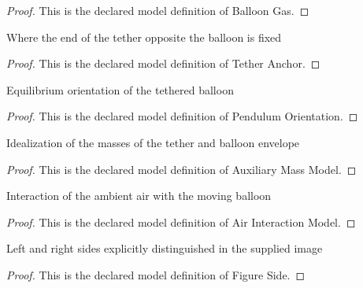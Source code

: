 \begin{proof}
  This is the declared model definition of Balloon Gas.
\end{proof}
\begin{definition}
  \label{def:physics:phyx-mini-0234:phyxminiproblems-problemphyxmini0234-tetheranchor}
  Where the end of the tether opposite the balloon is fixed
\end{definition}
\begin{proof}
  This is the declared model definition of Tether Anchor.
\end{proof}
\begin{definition}
  \label{def:physics:phyx-mini-0234:phyxminiproblems-problemphyxmini0234-pendulumorientation}
  Equilibrium orientation of the tethered balloon
\end{definition}
\begin{proof}
  This is the declared model definition of Pendulum Orientation.
\end{proof}
\begin{definition}
  \label{def:physics:phyx-mini-0234:phyxminiproblems-problemphyxmini0234-auxiliarymassmodel}
  Idealization of the masses of the tether and balloon envelope
\end{definition}
\begin{proof}
  This is the declared model definition of Auxiliary Mass Model.
\end{proof}
\begin{definition}
  \label{def:physics:phyx-mini-0234:phyxminiproblems-problemphyxmini0234-airinteractionmodel}
  Interaction of the ambient air with the moving balloon
\end{definition}
\begin{proof}
  This is the declared model definition of Air Interaction Model.
\end{proof}
\begin{definition}
  \label{def:physics:phyx-mini-0234:phyxminiproblems-problemphyxmini0234-figureside}
  Left and right sides explicitly distinguished in the supplied image
\end{definition}
\begin{proof}
  This is the declared model definition of Figure Side.
\end{proof}
